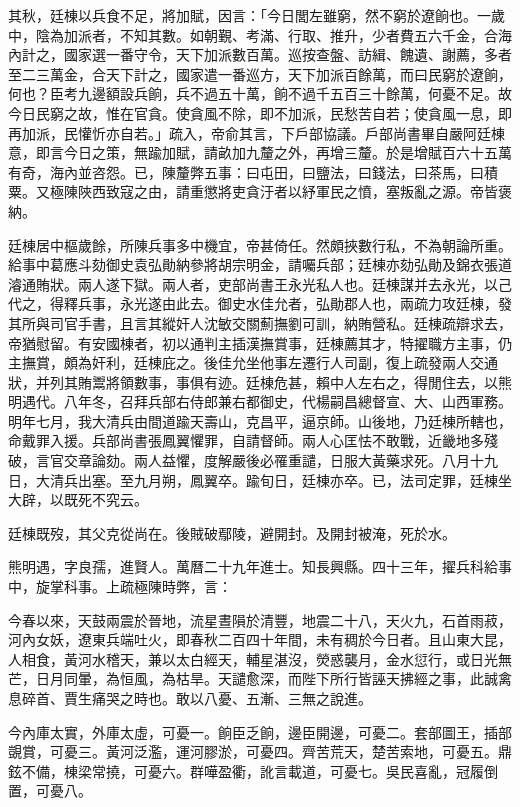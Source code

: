 \begin{pinyinscope}
其秋，廷棟以兵食不足，將加賦，因言：「今日閭左雖窮，然不窮於遼餉也。一歲中，陰為加派者，不知其數。如朝覲、考滿、行取、推升，少者費五六千金，合海內計之，國家選一番守令，天下加派數百萬。巡按查盤、訪緝、餽遺、謝薦，多者至二三萬金，合天下計之，國家遣一番巡方，天下加派百餘萬，而曰民窮於遼餉，何也？臣考九邊額設兵餉，兵不過五十萬，餉不過千五百三十餘萬，何憂不足。故今日民窮之故，惟在官貪。使貪風不除，即不加派，民愁苦自若；使貪風一息，即再加派，民懽忻亦自若。」疏入，帝俞其言，下戶部協議。戶部尚書畢自嚴阿廷棟意，即言今日之策，無踰加賦，請畝加九釐之外，再增三釐。於是增賦百六十五萬有奇，海內並咨怨。已，陳釐弊五事：曰屯田，曰鹽法，曰錢法，曰茶馬，曰積粟。又極陳陜西致寇之由，請重懲將吏貪汙者以紓軍民之憤，塞叛亂之源。帝皆褒納。

廷棟居中樞歲餘，所陳兵事多中機宜，帝甚倚任。然頗挾數行私，不為朝論所重。給事中葛應斗劾御史袁弘勛納參將胡宗明金，請囑兵部；廷棟亦劾弘勛及錦衣張道濬通賄狀。兩人遂下獄。兩人者，吏部尚書王永光私人也。廷棟謀并去永光，以己代之，得釋兵事，永光遂由此去。御史水佳允者，弘勛郡人也，兩疏力攻廷棟，發其所與司官手書，且言其縱奸人沈敏交關薊撫劉可訓，納賄營私。廷棟疏辯求去，帝猶慰留。有安國棟者，初以通判主插漢撫賞事，廷棟薦其才，特擢職方主事，仍主撫賞，頗為奸利，廷棟庇之。後佳允坐他事左遷行人司副，復上疏發兩人交通狀，并列其賄鬻將領數事，事俱有迹。廷棟危甚，賴中人左右之，得閒住去，以熊明遇代。八年冬，召拜兵部右侍郎兼右都御史，代楊嗣昌總督宣、大、山西軍務。明年七月，我大清兵由間道踰天壽山，克昌平，逼京師。山後地，乃廷棟所轄也，命戴罪入援。兵部尚書張鳳翼懼罪，自請督師。兩人心匡怯不敢戰，近畿地多殘破，言官交章論劾。兩人益懼，度解嚴後必罹重譴，日服大黃藥求死。八月十九日，大清兵出塞。至九月朔，鳳翼卒。踰旬日，廷棟亦卒。已，法司定罪，廷棟坐大辟，以既死不究云。

廷棟既歿，其父克從尚在。後賊破鄢陵，避開封。及開封被淹，死於水。

熊明遇，字良孺，進賢人。萬曆二十九年進士。知長興縣。四十三年，擢兵科給事中，旋掌科事。上疏極陳時弊，言：

今春以來，天鼓兩震於晉地，流星晝隕於清豐，地震二十八，天火九，石首雨菽，河內女妖，遼東兵端吐火，即春秋二百四十年間，未有稠於今日者。且山東大昆，人相食，黃河水稽天，兼以太白經天，輔星湛沒，熒惑襲月，金水愆行，或日光無芒，日月同暈，為恒風，為枯旱。天譴愈深，而陛下所行皆誣天拂經之事，此誠禽息碎首、賈生痛哭之時也。敢以八憂、五漸、三無之說進。

今內庫太實，外庫太虛，可憂一。餉臣乏餉，邊臣開邊，可憂二。套部圖王，插部覬賞，可憂三。黃河泛濫，運河膠淤，可憂四。齊苦荒天，楚苦索地，可憂五。鼎鉉不備，棟梁常撓，可憂六。群嘩盈衢，訛言載道，可憂七。吳民喜亂，冠履倒置，可憂八。


\end{pinyinscope}
